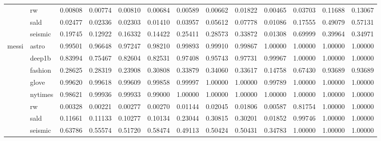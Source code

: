 \begin{tabular}{llrrrrrrrrrrr}
 & rw & 0.00808 & 0.00774 & 0.00810 & 0.00684 & 0.00589 & 0.00662 & 0.01822 & 0.00465 & 0.03703 & 0.11688 & 0.13067 \\
 & sald & 0.02477 & 0.02336 & 0.02303 & 0.01410 & 0.03957 & 0.05612 & 0.07778 & 0.01086 & 0.17555 & 0.49079 & 0.57131 \\
 & seismic & 0.19745 & 0.12922 & 0.16332 & 0.14422 & 0.25411 & 0.28573 & 0.33872 & 0.01308 & 0.69999 & 0.39964 & 0.34971 \\
\cline{1-13}
\multirow[t]{8}{*}{messi} & astro & 0.99501 & 0.96648 & 0.97247 & 0.98210 & 0.99893 & 0.99910 & 0.99867 & 1.00000 & 1.00000 & 1.00000 & 1.00000 \\
 & deep1b & 0.83994 & 0.75467 & 0.82604 & 0.82531 & 0.97408 & 0.95743 & 0.97731 & 0.99967 & 1.00000 & 1.00000 & 1.00000 \\
 & fashion & 0.28625 & 0.28319 & 0.23908 & 0.30808 & 0.33879 & 0.34060 & 0.33617 & 0.14758 & 0.67430 & 0.93689 & 0.93689 \\
 & glove & 0.99620 & 0.99618 & 0.99609 & 0.99858 & 0.99997 & 1.00000 & 1.00000 & 0.99789 & 1.00000 & 1.00000 & 1.00000 \\
 & nytimes & 0.98621 & 0.99936 & 0.99933 & 0.99000 & 1.00000 & 1.00000 & 1.00000 & 1.00000 & 1.00000 & 1.00000 & 1.00000 \\
 & rw & 0.00328 & 0.00221 & 0.00277 & 0.00270 & 0.01144 & 0.02045 & 0.01806 & 0.00587 & 0.81754 & 1.00000 & 1.00000 \\
 & sald & 0.11661 & 0.11133 & 0.10277 & 0.10134 & 0.23044 & 0.30815 & 0.30201 & 0.01852 & 0.99746 & 1.00000 & 1.00000 \\
 & seismic & 0.63786 & 0.55574 & 0.51720 & 0.58474 & 0.49113 & 0.50424 & 0.50431 & 0.34783 & 1.00000 & 1.00000 & 1.00000 \\
\cline{1-13}
\bottomrule
\end{tabular}

